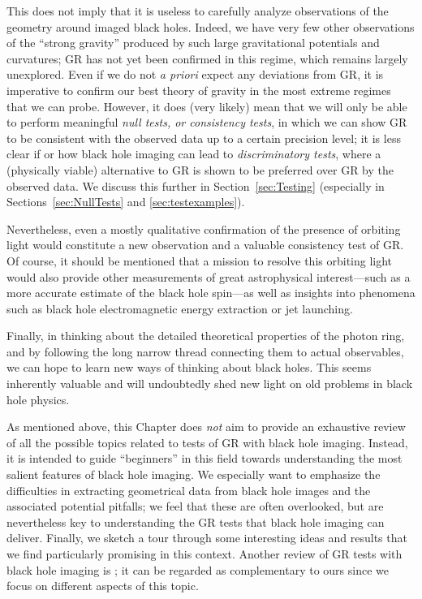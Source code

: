 \documentclass[graybox,envcountchap]{svmult}
\begin{document}
This does not imply that it is useless to carefully analyze observations of the geometry around imaged black holes.
Indeed, we have very few other observations of the ``strong gravity'' produced by such large gravitational potentials and curvatures; GR has not yet been confirmed in this regime, which remains largely unexplored.
Even if we do not \emph{a priori} expect any deviations from GR, it is imperative to confirm our best theory of gravity in the most extreme regimes that we can probe.
However, it does (very likely) mean that we will only be able to perform meaningful \emph{null tests, or consistency tests}, in which we can show GR to be consistent with the observed data up to a certain precision level; it is less clear if or how black hole imaging can lead to \emph{discriminatory tests}, where a (physically viable) alternative to GR is shown to be preferred over GR by the observed data.
We discuss this further in Section~\ref{sec:Testing} (especially in Sections~\ref{sec:NullTests} and \ref{sec:testexamples}).

Nevertheless, even a mostly qualitative confirmation of the presence of orbiting light would constitute a new observation and a valuable consistency test of GR.
Of course, it should be mentioned that a mission to resolve this orbiting light would also provide other measurements of great astrophysical interest---such as a more accurate estimate of the black hole spin---as well as insights into phenomena such as black hole electromagnetic energy extraction or jet launching.

Finally, in thinking about the detailed theoretical properties of the photon ring, and by following the long narrow thread connecting them to actual observables, we can hope to learn new ways of thinking about black holes.
This seems inherently valuable and will undoubtedly shed new light on old problems in black hole physics.

\bigskip

As mentioned above, this Chapter does \emph{not} aim to provide an exhaustive review of all the possible topics related to tests of GR with black hole imaging.
Instead, it is intended to guide ``beginners'' in this field towards understanding the most salient features of black hole imaging.
We especially want to emphasize the difficulties in extracting geometrical data from black hole images and the associated potential pitfalls; we feel that these are often overlooked, but are nevertheless key to understanding the GR tests that black hole imaging can deliver.
Finally, we sketch a tour through some interesting ideas and results that we find particularly promising in this context.
Another review of GR tests with black hole imaging is \cite{Psaltis2019}; it can be regarded as complementary to ours since we focus on different aspects of this topic.
\end{document}
